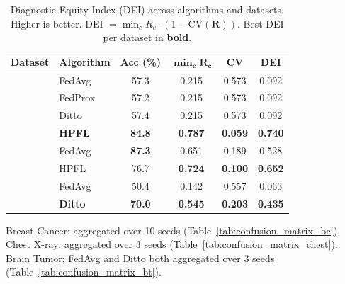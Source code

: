 \documentclass[conference,a4paper]{IEEEtran}
\begin{document}
\begin{table}[htbp]
\centering
\caption{Diagnostic Equity Index (DEI) across algorithms and datasets. Higher is better. DEI $= \min_c R_c \cdot (1 - \text{CV}(\mathbf{R}))$. Best DEI per dataset in \textbf{bold}.}
\label{tab:dei_results}
\small
\begin{tabular}{llcccc}
\toprule
\textbf{Dataset} & \textbf{Algorithm} & \textbf{Acc (\%)} & $\boldsymbol{\min_c R_c}$ & \textbf{CV} & \textbf{DEI} \\
\midrule
{} & FedAvg & 57.3 & 0.215 & 0.573 & 0.092 \\
 & FedProx & 57.2 & 0.215 & 0.573 & 0.092 \\
 & Ditto & 57.4 & 0.215 & 0.573 & 0.092 \\
 & \textbf{HPFL} & \textbf{84.8} & \textbf{0.787} & \textbf{0.059} & \textbf{0.740} \\
\midrule
{} & FedAvg & \textbf{87.3} & 0.651 & 0.189 & 0.528 \\
 & HPFL & 76.7 & \textbf{0.724} & \textbf{0.100} & \textbf{0.652} \\
\midrule
{} & FedAvg & 50.4 & 0.142 & 0.557 & 0.063 \\
 & \textbf{Ditto} & \textbf{70.0} & \textbf{0.545} & \textbf{0.203} & \textbf{0.435} \\
\bottomrule
\end{tabular}

\vspace{1mm}
\footnotesize{Breast Cancer: aggregated over 10 seeds (Table~\ref{tab:confusion_matrix_bc}). Chest X-ray: aggregated over 3 seeds (Table~\ref{tab:confusion_matrix_chest}). Brain Tumor: FedAvg and Ditto both aggregated over 3 seeds (Table~\ref{tab:confusion_matrix_bt}).}
\end{table}
\end{document}
